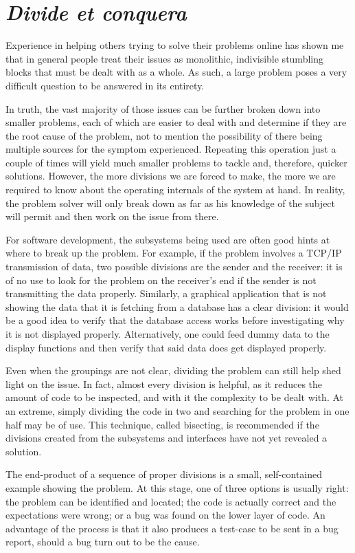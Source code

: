 \section*{\textit{Divide et conquera}}

Experience in helping others trying to solve their problems online has shown me
that in general people treat their issues as monolithic, indivisible stumbling
blocks that must be dealt with as a whole. As such, a large problem poses a very
difficult question to be answered in its entirety.

In truth, the vast majority of those issues can be further broken down into
smaller problems, each of which are easier to deal with and determine if they
are the root cause of the problem, not to mention the possibility of there being
multiple sources for the symptom experienced. Repeating this operation just a
couple of times will yield much smaller problems to tackle and, therefore,
quicker solutions. However, the more divisions we are forced to make, the more
we are required to know about the operating internals of the system at hand. In
reality, the problem solver will only break down as far as his knowledge of the
subject will permit and then work on the issue from there.

For software development, the subsystems being used are often good hints at
where to break up the problem. For example, if the problem involves a TCP/IP
transmission of data, two possible divisions are the sender and the receiver: it
is of no use to look for the problem on the receiver’s end if the sender is not
transmitting the data properly. Similarly, a graphical application that is not
showing the data that it is fetching from a database has a clear division: it
would be a good idea to verify that the database access works before
investigating why it is not displayed properly. Alternatively, one could feed
dummy data to the display functions and then verify that said data does get
displayed properly. 

Even when the groupings are not clear, dividing the problem can still help shed
light on the issue. In fact, almost every division is helpful, as it reduces the
amount of code to be inspected, and with it the complexity to be dealt with. At
an extreme, simply dividing the code in two and searching for the problem in one
half may be of use. This technique, called bisecting, is recommended if the
divisions created from the subsystems and interfaces have not yet revealed a
solution. 

The end-product of a sequence of proper divisions is a small, self-contained
example showing the problem. At this stage, one of three options is usually
right: the problem can be identified and located; the code is actually correct
and the expectations were wrong; or a bug was found on the lower layer of code.
An advantage of the process is that it also produces a test-case to be sent in a
bug report, should a bug turn out to be the cause.

